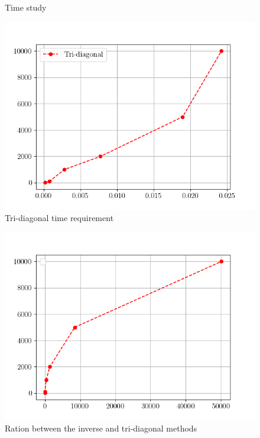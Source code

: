\begin{mdframed}[style=MyFrame]
\begin{figure}[H]
        \caption{Time study}
        \label{fig:time-comparison}
    \end{figure}
    \begin{figure}[H]
        \includegraphics[height=0.35\textheight]{../media/tri-solve.png}
        \caption{Tri-diagonal time requirement}
        \label{fig:time-tri}
    \end{figure}

    \begin{figure}[H]
        \includegraphics[height=0.35\textheight]{../media/time-ratio-solve.png}
        \caption{Ration between the inverse and tri-diagonal methods}
        \label{fig:time-ratio}
    \end{figure}
\end{mdframed}
